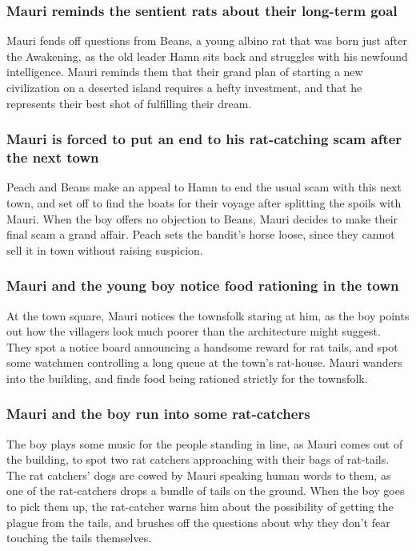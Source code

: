 \subsubsection{\Gls{Mauri} reminds the sentient rats about their long-term goal}
\Gls{Mauri} fends off questions from \Gls{Beans}, a young albino rat that was born just after the
Awakening, as the old leader \Gls{Hamn} sits back and struggles with his newfound intelligence.
\Gls{Mauri} reminds them that their grand plan of starting a new civilization on a deserted island
requires a hefty investment, and that he represents their best shot of fulfilling their dream.

\subsubsection{\Gls{Mauri} is forced to put an end to his rat-catching scam after the next town}
\Gls{Peach} and \Gls{Beans} make an appeal to \Gls{Hamn} to end the usual scam with this next town,
and set off to find the boats for their voyage after splitting the spoils with \Gls{Mauri}. When the
boy offers no objection to \Gls{Beans}, \Gls{Mauri} decides to make their final scam a grand affair.
\Gls{Peach} sets the bandit's horse loose, since they cannot sell it in town without raising
suspicion.

\subsubsection{\Gls{Mauri} and the young boy notice food rationing in the town}
At the town square, \Gls{Mauri} notices the townsfolk staring at him, as the boy points out how the
villagers look much poorer than the architecture might suggest. They spot a notice board announcing
a handsome reward for rat tails, and spot some watchmen controlling a long queue at the town's
rat-house. \Gls{Mauri} wanders into the building, and finds food being rationed strictly for the
townsfolk.

\subsubsection{\Gls{Mauri} and the boy run into some rat-catchers}
The boy plays some music for the people standing in line, as \Gls{Mauri} comes out of the building,
to spot two rat catchers approaching with their bags of rat-tails. The rat catchers' dogs are cowed
by \Gls{Mauri} speaking human words to them, as one of the rat-catchers drops a bundle of tails on
the ground. When the boy goes to pick them up, the rat-catcher warns him about the possibility of
getting the plague from the tails, and brushes off the questions about why they don't fear touching
the tails themselves.

